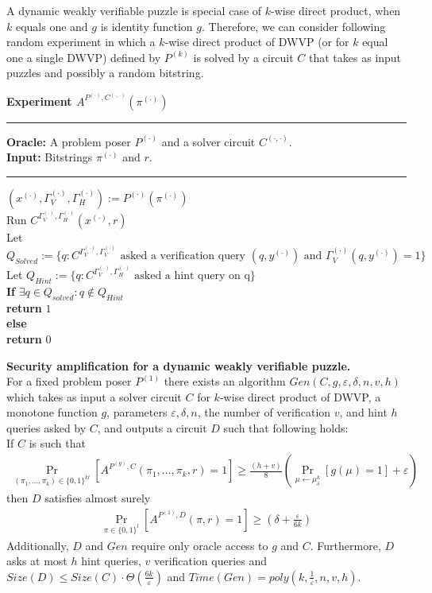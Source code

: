 %
A dynamic weakly verifiable puzzle is special case of $k$-wise direct product, when
$k$ equals one and $g$ is identity function $g$.
Therefore, we can consider following random experiment in which a $k$-wise direct product of DWVP (or for $k$ equal one a single DWVP) 
defined by $P^{(k)}$ is solved by a circuit $C$ that takes as input puzzles and possibly a random bitstring.
%
\begin{codeblock}
  \textbf{Experiment $A^{P^{(\cdot)}, C^{(\cdot, \cdot)}}(\pi^{(\cdot)})$}
  \medskip
  \hrule
  \medskip
  \textbf{Oracle:} A problem poser $P^{(\cdot)}$ and a solver circuit $C^{(\cdot,\cdot)}$.\\
  \textbf{Input:}  Bitstrings $\pi^{(\cdot)}$ and $r$.
  \medskip\hrule\medskip
  $(x^{(\cdot)}, \Gamma_V^{(\cdot)}, \Gamma_H^{(\cdot)}) := P^{(\cdot)}(\pi^{(\cdot)})$ \\
  Run $C^{\Gamma_V^{(\cdot)},\Gamma_H^{(\cdot)}}(x^{(\cdot)}, r)$ \\
  \IndI Let $Q_{Solved} := \{q: \text{$C^{\Gamma_V^{(\cdot)}, \Gamma_V^{(\cdot)}}$ asked a verification query $(q,y^{(\cdot)})$ and $\Gamma_V^{(\cdot)}(q, y^{(\cdot)}) = 1$} \}$\\
  \IndI Let $Q_{Hint} := \{q: \text{$C^{\Gamma_V^{(\cdot)}, \Gamma_H^{(\cdot)}}$ asked a hint query on q} \}$\\
  \textbf{If} $\exists q \in Q_{solved} : q \notin Q_{Hint}$ \then \\
  \IndI \textbf{return} $1$\\
  \textbf{else} \\
  \IndI \textbf{return} $0$\\
\end{codeblock}
%
\begin{theorem}{\textbf{Security amplification for a dynamic weakly verifiable puzzle.}}\\
  \label{th:sec_amp_for_dwvp}
  For a fixed problem poser $P^{(1)}$ there exists an algorithm $Gen(C, g, \varepsilon, \delta, n, v, h)$ which takes as input a solver circuit $C$ for $k$-wise
  direct product of DWVP, a monotone function $g$, parameters $\varepsilon, \delta,n$, the number of verification $v$, and hint $h$ queries asked by $C$, and outputs a circuit $D$
  such that following holds: \\
  If $C$ is such that \\
  \begin{align*}
    \underset{(\pi_1, \dots, \pi_k) \in \{0,1\}^{kl}}{\Pr}[A^{P^{(g)}, C}(\pi_1, \dots, \pi_k, r) = 1]
    \geq \frac{(h+v)}{8} \left(\underset{\mu \leftarrow \mu_\delta^k}{\Pr}[g(\mu) = 1] + \varepsilon\right)
  \end{align*}
  then $D$ satisfies almost surely
  \begin{align*}
    \underset{\pi \in \{0,1\}^{l}}{\Pr}[A^{P^{(1)},D}(\pi, r) = 1] \geq (\delta + \frac{\varepsilon}{6k})
  \end{align*}
  Additionally, $D$ and $Gen$ require only oracle access to $g$ and $C$. Furthermore, $D$ asks at most $h$ hint queries, $v$ verification queries and
  $Size(D) \leq Size(C) \cdot \Theta(\frac{6k}{\varepsilon})$ and $Time(Gen) = poly(k, \frac{1}{\varepsilon}, n, v, h)$.
\end{theorem}
